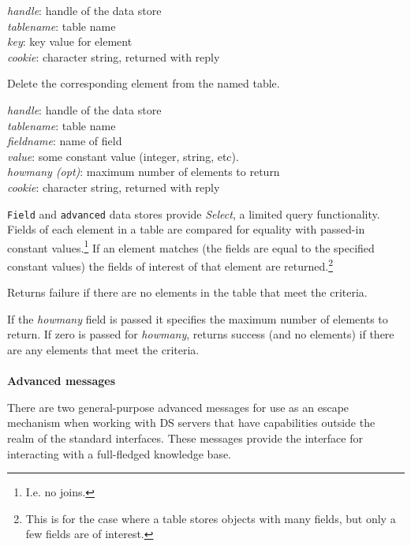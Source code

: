 {
\metP
    {\em handle}: handle of the data store\\
    {\em tablename}: table name\\
    {\em key}: key value for element\\
    {\em cookie}: character string, returned with reply

\metD
    Delete the corresponding element from the named table.  
}

{ 
\metP
    {\em handle}: handle of the data store\\
    {\em tablename}: table name\\
    {\em fieldname}: name of field\\
    {\em value}: some constant value (integer, string, etc).\\
    {\em howmany (opt)}: maximum number of elements to return\\
    {\em cookie}: character string, returned with reply

\metD
    {\tt Field} and {\tt advanced} data stores provide 
    {\em Select}, a limited query functionality. 
    Fields of each element in a table are compared for equality with
    passed-in constant values.\footnote{I.e. no joins.} If an element
    matches (the fields are equal to the specified constant values)
    the fields of interest of that element are returned.\footnote{This is
    for the case where a table stores objects with many fields, but
    only a few fields are of interest.}

    Returns failure if there are no elements in the table that meet the
    criteria. 

    If the {\em howmany} field is passed it specifies the maximum
    number of elements to return. If zero is passed for {\em howmany},
    returns success (and no elements) if there are any elements that
    meet the criteria.
}

\paragraph {}
{\bf Advanced messages} \label{sec:dsadvmsg}

There are two general-purpose advanced messages for use as an escape
mechanism when working with DS servers that have capabilities
outside the realm of the standard interfaces.  These messages provide
the interface for interacting with a full-fledged knowledge base.

